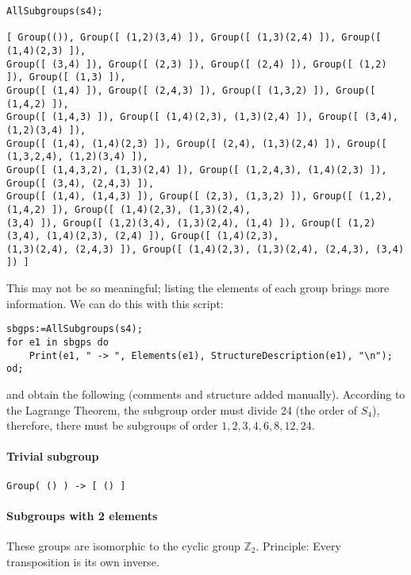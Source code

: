 \begin{verbatim}
AllSubgroups(s4);

[ Group(()), Group([ (1,2)(3,4) ]), Group([ (1,3)(2,4) ]), Group([ (1,4)(2,3) ]), 
Group([ (3,4) ]), Group([ (2,3) ]), Group([ (2,4) ]), Group([ (1,2) ]), Group([ (1,3) ]), 
Group([ (1,4) ]), Group([ (2,4,3) ]), Group([ (1,3,2) ]), Group([ (1,4,2) ]), 
Group([ (1,4,3) ]), Group([ (1,4)(2,3), (1,3)(2,4) ]), Group([ (3,4), (1,2)(3,4) ]), 
Group([ (1,4), (1,4)(2,3) ]), Group([ (2,4), (1,3)(2,4) ]), Group([ (1,3,2,4), (1,2)(3,4) ]), 
Group([ (1,4,3,2), (1,3)(2,4) ]), Group([ (1,2,4,3), (1,4)(2,3) ]), Group([ (3,4), (2,4,3) ]), 
Group([ (1,4), (1,4,3) ]), Group([ (2,3), (1,3,2) ]), Group([ (1,2), (1,4,2) ]), Group([ (1,4)(2,3), (1,3)(2,4),
(3,4) ]), Group([ (1,2)(3,4), (1,3)(2,4), (1,4) ]), Group([ (1,2)(3,4), (1,4)(2,3), (2,4) ]), Group([ (1,4)(2,3),
(1,3)(2,4), (2,4,3) ]), Group([ (1,4)(2,3), (1,3)(2,4), (2,4,3), (3,4) ]) ]
\end{verbatim}

This may not be so meaningful; listing the elements of each group brings
more information. We can do this with this script:

\begin{verbatim}
sbgps:=AllSubgroups(s4);
for e1 in sbgps do
    Print(e1, " -> ", Elements(e1), StructureDescription(e1), "\n");
od;
\end{verbatim}

and obtain the following (comments and structure added manually).
According to the Lagrange Theorem, the subgroup order must divide 24
(the order of \(S_4\)), therefore, there must be subgroups of order
\(1,2,3,4,6,8,12,24\).

\paragraph{Trivial subgroup}\label{trivial-subgroup}

\begin{verbatim}
Group( () ) -> [ () ]
\end{verbatim}

\paragraph{Subgroups with 2 elements}\label{subgroups-with-2-elements}

These groups are isomorphic to the cyclic group \(\mathbb{Z}_2\).
Principle: Every transposition is its own inverse.

